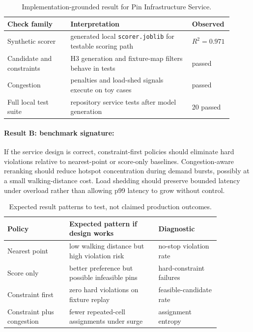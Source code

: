\documentclass{article}
\begin{document}
\begin{table}[t]
\centering
\caption{Implementation-grounded result for Pin Infrastructure Service.}
\begin{tabular}{@{}p{0.27\linewidth}p{0.52\linewidth}p{0.12\linewidth}@{}}
\toprule
\textbf{Check family} & \textbf{Interpretation} & \textbf{Observed}\\
\midrule
Synthetic scorer & generated local \texttt{scorer.joblib} for testable scoring path & $R^2=0.971$\\
Candidate and constraints & H3 generation and fixture-map filters behave in tests & passed\\
Congestion & penalties and load-shed signals execute on toy cases & passed\\
Full local test suite & repository service tests after model generation & 20 passed\\
\bottomrule
\end{tabular}
\end{table}

\paragraph{Result B: benchmark signature:}

If the service design is correct, constraint-first policies should eliminate hard violations relative to nearest-point or score-only baselines. Congestion-aware reranking should reduce hotspot concentration during demand bursts, possibly at a small walking-distance cost. Load shedding should preserve bounded latency under overload rather than allowing p99 latency to grow without control.

\begin{table}[t]
\centering
\caption{Expected result patterns to test, not claimed production outcomes.}
\begin{tabular}{@{}p{0.25\linewidth}p{0.36\linewidth}p{0.25\linewidth}@{}}
\toprule
\textbf{Policy} & \textbf{Expected pattern if design works} & \textbf{Diagnostic}\\
\midrule
Nearest point & low walking distance but high violation risk & no-stop violation rate\\
Score only & better preference but possible infeasible pins & hard-constraint failures\\
Constraint first & zero hard violations on fixture replay & feasible-candidate rate\\
Constraint plus congestion & fewer repeated-cell assignments under surge & assignment entropy\\
\bottomrule
\end{tabular}
\end{table}
\end{document}
